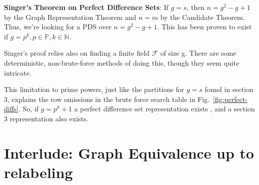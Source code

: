\documentclass[11pt, oneside]{article} 	%
\begin{document}
\begin{framed}
\textbf{Singer's Theorem on Perfect Difference Sets}: If $g=s$, then $n=g^2-g+1$ by the Graph Representation Theorem and $n=m$ by the Candidate Theorem. Thus, we're looking for a PDS over $n=g^2-g+1$. This has been proven to exist if $g =p^k, p \in \mathbb{P}, k \in \mathbb{N}$. 
\end{framed}

Singer's proof relies also on finding a finite field $\mathcal{F}$ of size g. There are some deterministic, non-brute-force methods of doing this\cite{4}, though they seem quite intricate.

This limitation to prime powers, just like the partitions for $g=s$ found in section 3, explains the row omissions in the brute force search table in Fig.~\ref{fig:perfect-diffs}. So, if $g=p^k+1$ a perfect difference set representation exists , and a section 3 representation also exists. 

\section{Interlude: Graph Equivalence up to relabeling}
\end{document}
